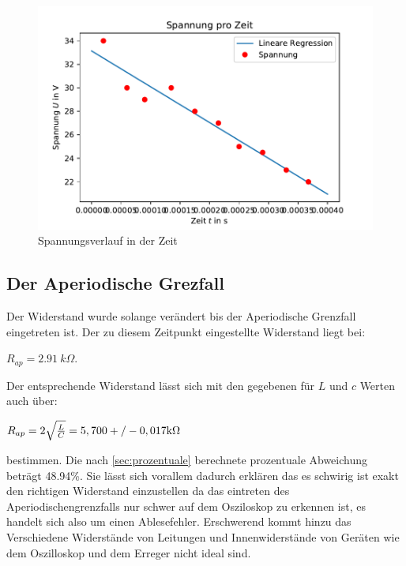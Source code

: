 \begin{figure}
    \centering
    \includegraphics{spannungsverlauf.pdf}
    \caption{Spannungsverlauf in der Zeit}
    \label{fig:bild1}
  \end{figure}

  \subsection{Der Aperiodische Grezfall}
  Der Widerstand wurde solange verändert bis der Aperiodische Grenzfall eingetreten ist. Der zu diesem 
  Zeitpunkt eingestellte Widerstand liegt bei:
  \begin{center}
      $R_{ap}=\SI[]{2.91}[]{k\Omega}$.\\
  \end{center}
  Der entsprechende Widerstand lässt sich mit den gegebenen für $L$ und $c$ Werten auch über:
  \begin{center}
      $R_{ap}=2\sqrt{\frac{L}{C}}=5,700+/-0,017\si[]{k\Omega}$
  \end{center}
  bestimmen. Die nach \autoref{sec:prozentuale} berechnete prozentuale Abweichung beträgt 48.94\%.
  Sie lässt sich vorallem dadurch erklären das es schwirig ist exakt den richtigen Widerstand 
  einzustellen da das eintreten des Aperiodischengrenzfalls nur schwer auf dem Osziloskop zu erkennen  ist,
  es handelt sich also um einen Ablesefehler. Erschwerend kommt hinzu das Verschiedene Widerstände von Leitungen
  und Innenwiderstände von Geräten wie dem Oszilloskop und dem Erreger nicht ideal sind.

